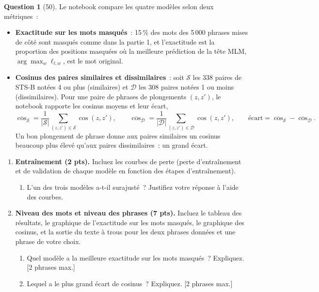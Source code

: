 \documentclass[12pt]{article}
\theoremstyle{definition}
\newtheorem{exercise}{Question}%
\begin{document}
\begin{exercise}[50]
Le notebook compare les quatre modèles selon deux métriques~:
\begin{itemize}
  \item \textbf{Exactitude sur les mots masqués}~: 15\,\% des mots des 5\,000 phrases mises de côté sont masqués
        comme dans la partie 1, et l'exactitude est la proportion des positions masquées où la meilleure prédiction
        de la tête MLM, $\arg\max_w \ell_{t,w}$, est le mot original.
  \item \textbf{Cosinus des paires similaires et dissimilaires}~: soit $\mathcal{S}$ les 338 paires de STS-B notées
        4 ou plus (similaires) et $\mathcal{D}$ les 308 paires notées 1 ou moins (dissimilaires). Pour une paire de
        phrases de plongements $(z, z')$, le notebook rapporte les cosinus moyens et leur écart,
        \[
          \overline{\cos}_{\mathcal{S}} = \frac{1}{|\mathcal{S}|} \sum_{(z, z') \in \mathcal{S}} \cos(z, z'), \qquad
          \overline{\cos}_{\mathcal{D}} = \frac{1}{|\mathcal{D}|} \sum_{(z, z') \in \mathcal{D}} \cos(z, z'), \qquad
          \text{écart} = \overline{\cos}_{\mathcal{S}} - \overline{\cos}_{\mathcal{D}}.
        \]
        Un bon plongement de phrase donne aux paires similaires un cosinus beaucoup plus élevé qu'aux paires
        dissimilaires~: un grand écart.
\end{itemize}

\begin{enumerate}
  \item \textbf{Entraînement (2 pts).} Incluez les courbes de perte (perte d'entraînement et de validation de chaque
  modèle en fonction des étapes d'entraînement).
  \begin{enumerate}
    \item L'un des trois modèles a-t-il surajusté~? Justifiez votre réponse à l'aide des courbes.
  \end{enumerate}

  \item \textbf{Niveau des mots et niveau des phrases (7 pts).} Incluez le tableau des résultats, le graphique de
  l'exactitude sur les mots masqués, le graphique des cosinus, et la sortie du texte à trous pour les deux phrases
  données et une phrase de votre choix.
  \begin{enumerate}
    \item Quel modèle a la meilleure exactitude sur les mots masqués~? Expliquez. [2 phrases max.]
    \item Lequel a le plus grand écart de cosinus~? Expliquez. [2 phrases max.]
  \end{enumerate}


\end{enumerate}
\end{exercise}
\end{document}
